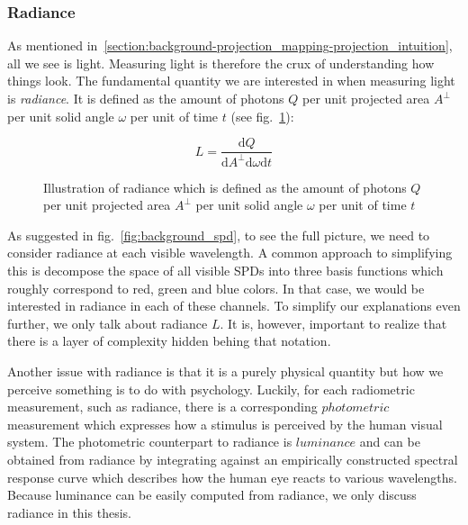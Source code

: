 \subsubsection{Radiance}
\label{section:background-projection_mapping-light_transport-radiance}

As mentioned in~\ref{section:background-projection_mapping-projection_intuition}, all we see is light. Measuring light is therefore the crux of understanding how things look. The fundamental quantity we are interested in when measuring light is \textit{radiance}. It is defined as the amount of photons \(Q\) per unit projected area \(A^\perp \) per unit solid angle \(\omega\) per unit of time \(t\) (see fig.~\ref{fig:background_radiance}):

\begin{equation}
    \label{eq:radiance}
    L = \frac{\mathrm{d}Q}{\mathrm{d}A^\perp \mathrm{d}\omega \mathrm{d}t}
\end{equation}

\begin{figure}
    \centering
    \def\svgwidth{0.5\textwidth}
    
    \caption{Illustration of radiance which is defined as the amount of photons \(Q\) per unit projected area \(A^\perp \) per unit solid angle \(\omega\) per unit of time \(t\)}
    \label{fig:background_radiance}
\end{figure}

As suggested in fig.~\ref{fig:background_spd}, to see the full picture, we need to consider radiance at each visible wavelength. A common approach to simplifying this is decompose the space of all visible SPDs into three basis functions which roughly correspond to red, green and blue colors. In that case, we would be interested in radiance in each of these channels. To simplify our explanations even further, we only talk about radiance \(L\). It is, however, important to realize that there is a layer of complexity hidden behing that notation.

Another issue with radiance is that it is a purely physical quantity but how we perceive something is to do with psychology. Luckily, for each radiometric measurement, such as radiance, there is a corresponding \(photometric\) measurement which expresses how a stimulus is perceived by the human visual system. The photometric counterpart to radiance is \(luminance\) and can be obtained from radiance by integrating against an empirically constructed spectral response curve which describes how the human eye reacts to various wavelengths. Because luminance can be easily computed from radiance, we only discuss radiance in this thesis.

